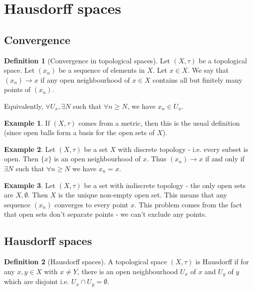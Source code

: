 \documentclass{article}
\theoremstyle{definition}
\newtheorem{defn}{Definition}[section]
\newtheorem{exmp}{Example}[section]
\theoremstyle{plain}%
\theoremstyle{remark}
\begin{document}
\section{Hausdorff spaces}

\subsection{Convergence}

\begin{defn}[Convergence in topological spaces]
    Let $(X, \tau)$ be a topological space. Let $(x_n)$ be a sequence of elements in $X$. Let $x \in X$. We say that $(x_n) \to x$ if any open neighbourhood of $x \in X$ contains all but finitely many points of $(x_n)$.
    
    Equivalently, $\forall U_x, \exists N$ such that $\forall n \ge N$, we have $x_n \in U_x$.
\end{defn}

\begin{exmp}
    If $(X, \tau)$ comes from a metric, then this is the usual definition (since open balls form a basis for the open sets of $X$).
\end{exmp}

\begin{exmp}
    Let $(X, \tau)$ be a set $X$ with discrete topology - i.e. every subset is open. Then $\{x\}$ is an open neighbourhood of $x$. Thus $(x_n) \to x$ if and only if $\exists N$ such that $\forall n \ge N$ we have $x_n = x$.
\end{exmp}

\begin{exmp}
    Let $(X, \tau)$ be a set with indiscrete topology - the only open sets are $X, \emptyset$. Then $X$ is the unique non-empty open set. This means that any sequence $(x_n)$ converges to every point $x$. This problem comes from the fact that open sets don't separate points - we can't exclude any points.
\end{exmp}

\subsection{Hausdorff spaces}

\begin{defn}[Hausdorff spaces]
    A topological space $(X, \tau)$ is Hausdorff if for any $x,y \in X$ with $x \ne Y$, there is an open neighbourhood $U_x$ of $x$ and $U_y$ of $y$ which are disjoint i.e. $U_x \cap U_y = \emptyset$.
\end{defn}
\end{document}

